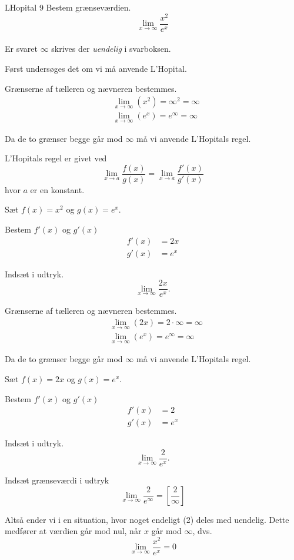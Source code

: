 \documentclass{article}
\begin{document}
\begin{exercise}{LHopital 9}
	Bestem grænseværdien.
	\[
	\lim_{x \to \infty} \frac{x^2}{e^x}
	\] 
	\\
	Er svaret $\infty$ skrives der \emph{uendelig} i svarboksen.
	
	
	\hint
	Først undersøges det om vi må anvende L'Hopital.
	
	\hint
	Grænserne af tælleren og nævneren bestemmes.
	\begin{align*}
		&\lim_{x \to \infty} (x^2) = \infty ^2 = \infty \\
		&\lim_{x \to \infty} (e^x) = e^\infty = \infty
	\end{align*}
	
	\hint
	Da de to grænser begge går mod $\infty$ må vi  anvende L'Hopitals regel. 
	
	\hint
	L'Hopitals regel er givet ved
	\[
	\lim_{x \to a} \frac{f(x)}{g(x)} = \lim_{x \to a} \frac{f'(x)}{g'(x)} 
	\]
	hvor $a$  er en konstant.
	
	\hint
	Sæt $f(x) = x^2$ og $g(x) = e^x$. 
	
	\hint
	Bestem $f'(x)$ og $g'(x)$
	\begin{align*}
		f'(x) &= 2x \\
		g'(x) &= e^x
	\end{align*}
	
	\hint
	Indsæt i udtryk.
	\[
	\lim_{x \to \infty} \frac{2x}{e^x}.
	\]
	
	\hint
	Grænserne af tælleren og nævneren bestemmes.
	\begin{align*}
		&\lim_{x \to \infty} (2x) = 2 \cdot \infty  = \infty \\
		&\lim_{x \to \infty} (e^x) = e^\infty = \infty
	\end{align*}
	
	\hint
	Da de to grænser begge går mod $\infty$ må vi  anvende L'Hopitals regel. 
	
		\hint
	Sæt $f(x) = 2x$ og $g(x) = e^x$. 
	
	\hint
	Bestem $f'(x)$ og $g'(x)$
	\begin{align*}
		f'(x) &= 2 \\
		g'(x) &= e^x
	\end{align*}
	
	\hint
	Indsæt i udtryk.
	\[
	\lim_{x \to \infty} \frac{2}{e^x}.
	\]
	
	
	\hint
	Indsæt grænseværdi i udtryk
	\[
	\lim_{x \to \infty} \frac{2}{e^\infty}  = \left[ \frac{2}{\infty}  \right] 
	\]
	
	\hint
	Altså ender vi i en situation, hvor noget endeligt (2) deles med uendelig. Dette medfører at værdien går mod nul, når $x$ går mod $\infty$, dvs.
	\[
	\lim_{x \to \infty} \frac{x^2}{e^x} = 0
	\]
	
\end{exercise}
\end{document}
